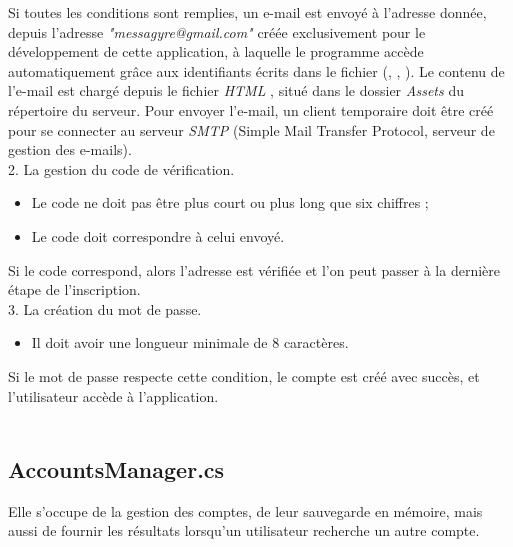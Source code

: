 \documentclass[12pt]{report}
\begin{document}
	Si toutes les conditions sont remplies, un e-mail est envoyé à l’adresse donnée, depuis l’adresse \textit{"messagyre@gmail.com"} créée exclusivement pour le développement de cette application, à laquelle le programme accède automatiquement grâce aux identifiants écrits dans le fichier (, , ). Le contenu de l’e-mail est chargé depuis le fichier \textit{HTML} , situé dans le dossier \textit{Assets} du répertoire du serveur. Pour envoyer l’e-mail, un client temporaire doit être créé pour se connecter au serveur \textit{SMTP} (Simple Mail Transfer Protocol, serveur de gestion des e-mails).
	\\
	
	2. La gestion du code de vérification.
	
	\begin{itemize}
		\item Le code ne doit pas être plus court ou plus long que six chiffres ;
		\item Le code doit correspondre à celui envoyé.
	\end{itemize}
	
	Si le code correspond, alors l’adresse est vérifiée et l’on peut passer à la dernière étape de l’inscription.
	\\
	
	3. La création du mot de passe.
	
	\begin{itemize}
		\item Il doit avoir une longueur minimale de 8 caractères.
	\end{itemize}
	
	Si le mot de passe respecte cette condition, le compte est créé avec succès, et l’utilisateur accède à l’application.
	\\\\
	
	\subsection{AccountsManager.cs}
	Elle s’occupe de la gestion des comptes, de leur sauvegarde en mémoire, mais aussi de fournir les résultats lorsqu’un utilisateur recherche un autre compte.
	
\end{document}
